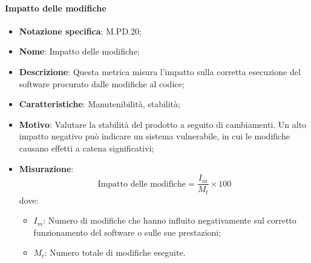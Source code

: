 \paragraph*{Impatto delle modifiche}
\begin{itemize}
    \item \textbf{Notazione specifica}: M.PD.20;
    \item \textbf{Nome}: Impatto delle modifiche;
    \item \textbf{Descrizione}: Questa metrica misura l'impatto sulla corretta esecuzione del software procurato dalle modifiche al codice;
    \item \textbf{Caratteristiche}: Manutenibilità, stabilità;
    \item \textbf{Motivo}: Valutare la stabilità del prodotto a seguito di cambiamenti. Un alto impatto negativo può indicare un sistema vulnerabile, in cui le modifiche causano effetti a catena significativi;
    \item \textbf{Misurazione}: 
    \[
    \text{Impatto delle modifiche} = \frac{I_{m}}{M_{t}} \times 100
    \]
    dove:
    \begin{itemize}
        \item $I_{m}$: Numero di modifiche che hanno influito negativamente sul corretto funzionamento del software o sulle sue prestazioni;
        \item $M_{t}$: Numero totale di modifiche eseguite.
    \end{itemize}
\end{itemize}
